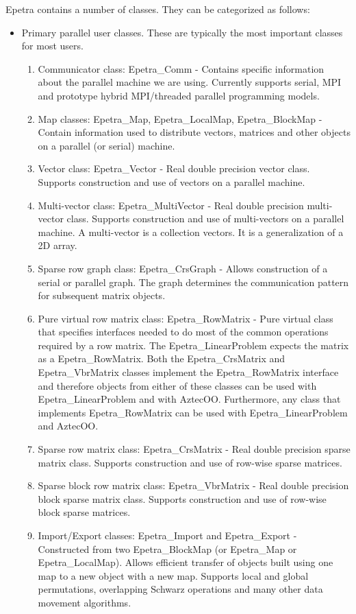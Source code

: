 Epetra contains a number of classes.  They can be categorized as follows:
\begin{itemize}
\item Primary parallel user classes.  These are typically the most
  important classes for most users.
\begin{enumerate}
\item Communicator class: Epetra\_Comm - Contains specific information
  about the parallel machine we are using.  Currently supports serial,
  MPI and prototype hybrid MPI/threaded parallel programming models.
\item Map classes: Epetra\_Map, Epetra\_LocalMap, Epetra\_BlockMap -
  Contain information used to distribute vectors, matrices and other
  objects on a parallel (or serial) machine.
\item Vector class: Epetra\_Vector - Real double precision vector class.
  Supports construction and use of vectors on a parallel machine.
\item Multi-vector class: Epetra\_MultiVector - Real double precision
  multi-vector class.  Supports construction and use of multi-vectors on
  a parallel machine.  A multi-vector is a collection vectors.  It is a
  generalization of a 2D array.
\item Sparse row graph class: Epetra\_CrsGraph - Allows construction of a
  serial or parallel graph.  The graph determines the communication
  pattern for subsequent matrix objects.
\item Pure virtual row matrix class: Epetra\_RowMatrix - Pure virtual
  class that specifies interfaces needed to do most of the common
  operations required by a row matrix.  The Epetra\_LinearProblem expects
  the matrix as a Epetra\_RowMatrix.  Both the Epetra\_CrsMatrix and
  Epetra\_VbrMatrix classes implement the Epetra\_RowMatrix interface and
  therefore objects from either of these classes can be used with
  Epetra\_LinearProblem and with AztecOO.  Furthermore, any class that
  implements Epetra\_RowMatrix can be used with Epetra\_LinearProblem and
  AztecOO.
\item Sparse row matrix class: Epetra\_CrsMatrix - Real double precision
  sparse matrix class.  Supports construction and use of row-wise sparse
  matrices.
\item Sparse block row matrix class: Epetra\_VbrMatrix - Real double
  precision block sparse matrix class.  Supports construction and use of
  row-wise block sparse matrices.
\item Import/Export classes: Epetra\_Import and Epetra\_Export -
  Constructed from two Epetra\_BlockMap (or Epetra\_Map or
  Epetra\_LocalMap).  Allows efficient transfer of objects built using
  one map to a new object with a new map.  Supports local and global
  permutations, overlapping Schwarz operations and many other data
  movement algorithms.
\end{enumerate}     


\end{itemize}
